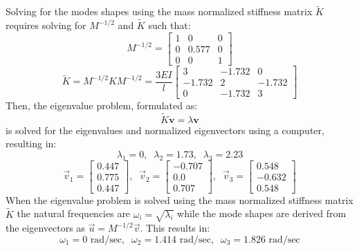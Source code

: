 \documentclass[12pt,letter]{article}
\begin{document}
\begin{example}
	Solving for the modes shapes using the  mass normalized stiffness matrix $\tilde{K}$ requires solving for $M^{-1/2}$ and $\tilde{K}$ such that:
	\begin{equation}
		  M^{-1/2} = \begin{bmatrix} 1 & 0 & 0 \\    0  & 0.577 & 0 \\ 0  & 0 & 1 \end{bmatrix}
	\end{equation}
	\begin{equation}
		   \tilde{K} = M^{-1/2} K M^{-1/2} = \frac{3EI}{l} \begin{bmatrix} 3 & -1.732 & 0 \\  -1.732  & 2 & -1.732 \\  0  & -1.732 & 3 \end{bmatrix} 
	\end{equation}
	Then, the eigenvalue problem, formulated as:
	\begin{equation}
	\tilde{K} \textbf{v} = \lambda \textbf{v}
	\end{equation}
	is solved for the eigenvalues and normalized eigenvectors using a computer, resulting in:
	\begin{equation}
	\lambda_1 = 0, \; \; \lambda_2 = 1.73, \; \; \lambda_3 = 2.23
	\end{equation}
	\begin{equation}
	\vec{v}_1 = \begin{bmatrix} 0.447 \\    0.775 \\    0.447  \end{bmatrix}, \; \; \vec{v}_2 = \begin{bmatrix} -0.707 \\    0.0 \\    0.707 \end{bmatrix}, \; \; \vec{v}_3 = \begin{bmatrix} 0.548 \\    -0.632 \\    0.548  \end{bmatrix}
	\end{equation}
	When the eigenvalue problem is solved using the mass normalized stiffness matrix $\tilde{K}$ the natural frequencies are $\omega_i = \sqrt{\lambda_i}$ while the mode shapes are derived from the eigenvectors as $\vec{u}=M^{-1/2}\vec{v}$. This results in:
	\begin{equation}
	\omega_1 = 0  \text{ rad/sec}, \; \; \omega_2 = 1.414 \text{ rad/sec}, \; \; \omega_3 = 1.826  \text{ rad/sec}

\end{equation}
\end{example}
\end{document}
